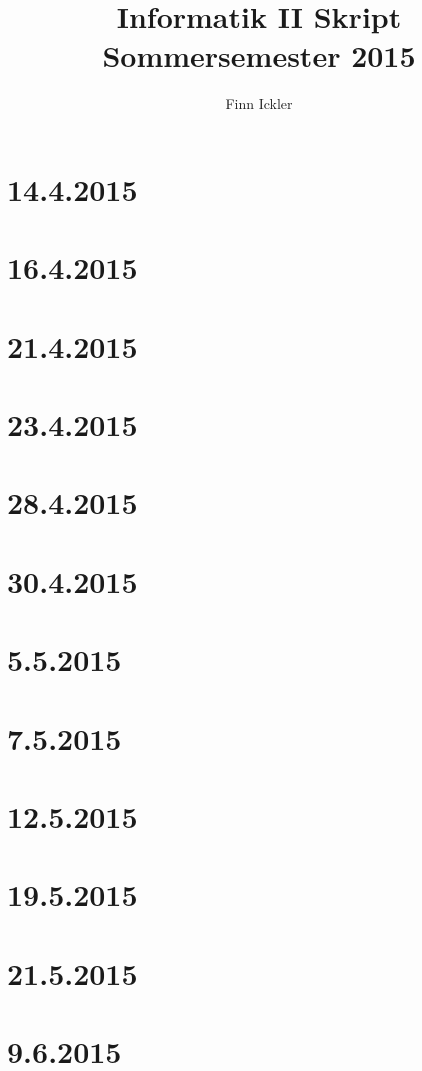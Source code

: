 \documentclass[12pt,twoside]{article}
\author{Finn Ickler}
\title{Informatik II Skript Sommersemester 2015}
\begin{document}
	\graphicspath{{./Graphics/}}
\renewcommand{\underline}[1]{\emph{#1}}
\renewcommand{\uline}[1]{\emph{#1}}
\maketitle
\tableofcontents
\lstlistoflistings
\newpage
\section{14.4.2015}

\section{16.4.2015}

\section{21.4.2015}

\section{23.4.2015}

\section{28.4.2015}

\section{30.4.2015}

\section{5.5.2015}

\section{7.5.2015}

\section{12.5.2015}

\section{19.5.2015}

\section{21.5.2015}

\section{9.6.2015}

\end{document}
